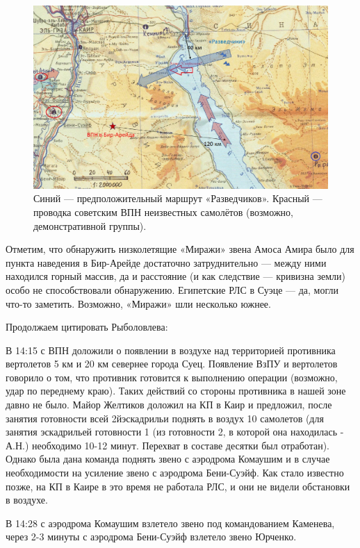 \begin{figure}[h!tb] 
	\centering\includegraphics[scale=0.25]{Dolina_5/2p7rkGhu9Io.jpg}
	\caption{Синий — предположительный маршрут «Разведчиков». Красный — проводка советским ВПН неизвестных самолётов (возможно, демонстративной группы). }%
\end{figure}

Отметим, что обнаружить низколетящие «Миражи» звена Амоса Амира было для пункта наведения в Бир-Арейде достаточно затруднительно — между ними находился горный массив, да и расстояние (и как следствие — кривизна земли) особо не способствовали обнаружению. Египетские РЛС в Суэце — да, могли что-то заметить. Возможно, «Миражи» шли несколько южнее.

Продолжаем цитировать Рыболовлева:

\begin{textcitation}
	В 14:15 с ВПН доложили о появлении в воздухе над территорией противника вертолетов 5 км и 20 км севернее города Суец. Появление ВзПУ и вертолетов говорило о том, что противник готовится к выполнению операции (возможно, удар по переднему краю). Таких действий со стороны противника в нашей зоне давно не было. Майор Желтиков доложил на КП в Каир и предложил, после занятия готовности всей 2йэскадрильи поднять в воздух 10 самолетов (для занятия эскадрильей готовности 1 (из готовности 2, в которой она находилась - А.Н.) необходимо 10-12 минут. Перехват в составе десятки был отработан). Однако была дана команда поднять звено с аэродрома Комаушим и в случае необходимости на усиление звено с аэродрома Бени-Суэйф. Как стало известно позже, на КП в Каире в это время не работала РЛС, и они не видели обстановки в воздухе. 
	
	В 14:28 с аэродрома Комаушим взлетело звено под командованием Каменева, через 2-3 минуты с аэродрома Бени-Суэйф взлетело звено Юрченко. 
\end{textcitation}

